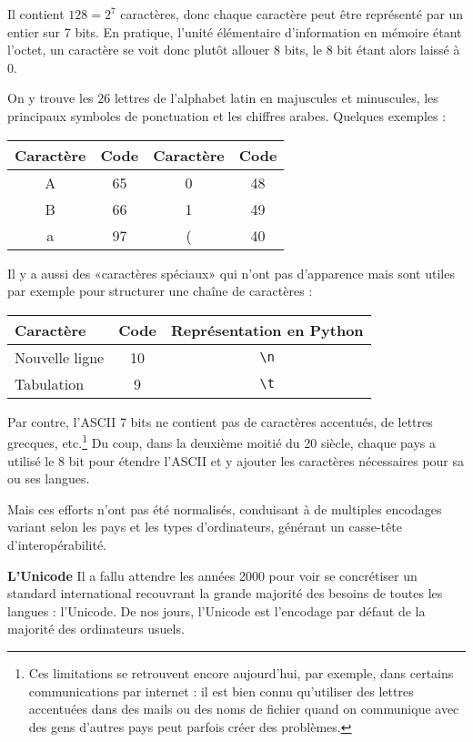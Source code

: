 Il contient $128=2^7$ caractères, donc chaque caractère peut être représenté par un entier sur 7  bits. En pratique, l'unité élémentaire d'information en mémoire étant l'octet, un caractère se voit donc plutôt allouer 8  bits, le 8\ieme{} bit étant alors laissé à 0.

On y trouve les 26 lettres de l'alphabet latin en majuscules et minuscules, les principaux symboles de ponctuation et les chiffres arabes. Quelques exemples :
	\begin{center}
	\begin{tabular}{cc|cc}
	Caractère & Code & Caractère & Code\\
	\hline
	A & 65 & 0 & 48\\
	B & 66 & 1 & 49\\
	a & 97 & ( & 40
	\end{tabular}
	\end{center}
Il y a aussi des «caractères spéciaux» qui n'ont pas d'apparence mais sont utiles par exemple pour structurer une chaîne de caractères :
	\begin{center}
	\begin{tabular}{lcc}
	Caractère & Code & Représentation en Python\\
	\hline
	Nouvelle ligne & 10 & \verb|\n|\\
	Tabulation & 9 & \verb|\t|
	\end{tabular}
	\end{center}

Par contre, l'ASCII 7  bits ne contient pas de caractères accentués, de lettres grecques, etc.\footnote{Ces limitations se retrouvent encore aujourd'hui, par exemple, dans certains communications par internet : il est bien connu qu'utiliser des lettres accentuées dans des mails ou des noms de fichier quand on communique avec des gens d'autres pays peut parfois créer des problèmes.} Du coup, dans la deuxième moitié du 20\ieme{} siècle, chaque pays a utilisé le 8\ieme{} bit pour étendre l'ASCII et y ajouter les caractères nécessaires pour sa ou ses langues.

Mais ces efforts n'ont pas été normalisés, conduisant à de multiples encodages variant selon les pays et les types d'ordinateurs, générant un casse-tête d'interopérabilité.


{\bf L'Unicode}
Il a fallu attendre les années 2000 pour voir se concrétiser un standard international recouvrant la grande majorité des besoins de toutes les langues : l'Unicode. De nos jours, l'Unicode est l'encodage par défaut de la majorité des ordinateurs usuels.

